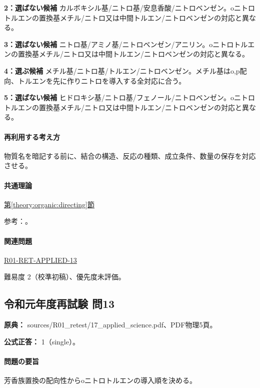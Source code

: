 \noindent\textbf{2：選ばない候補} カルボキシル基/ニトロ基/安息香酸/ニトロベンゼン。oニトロトルエンの置換基メチル/ニトロ又は中間トルエン/ニトロベンゼンの対応と異なる。\par

\noindent\textbf{3：選ばない候補} ニトロ基/アミノ基/ニトロベンゼン/アニリン。oニトロトルエンの置換基メチル/ニトロ又は中間トルエン/ニトロベンゼンの対応と異なる。\par

\noindent\textbf{4：選ぶ候補} メチル基/ニトロ基/トルエン/ニトロベンゼン。メチル基はo,p配向、トルエンを先に作りニトロを導入する全対応に合う。\par

\noindent\textbf{5：選ばない候補} ヒドロキシ基/ニトロ基/フェノール/ニトロベンゼン。oニトロトルエンの置換基メチル/ニトロ又は中間トルエン/ニトロベンゼンの対応と異なる。\par

\paragraph{再利用する考え方} 物質名を暗記する前に、結合の構造、反応の種類、成立条件、数量の保存を対応させる。

\paragraph{共通理論} \hyperref[theory:organic:directing]{第\ref*{theory:organic:directing}節}

\par 参考：\cite{organic_directing}。

\paragraph{関連問題} \hyperref[q:r01-ret-applied-13]{R01-RET-APPLIED-13}

\par 難易度 2（校準初稿）、優先度未評価。

\subsection{令和元年度再試験 問13}
\label{q:r01-ret-applied-13}

\noindent\textbf{原典：} sources/R01\_retest/17\_applied\_science.pdf、PDF物理5頁。

\textbf{公式正答：} 1（single）。

\paragraph{問題の要旨} 芳香族置換の配向性からoニトロトルエンの導入順を決める。

